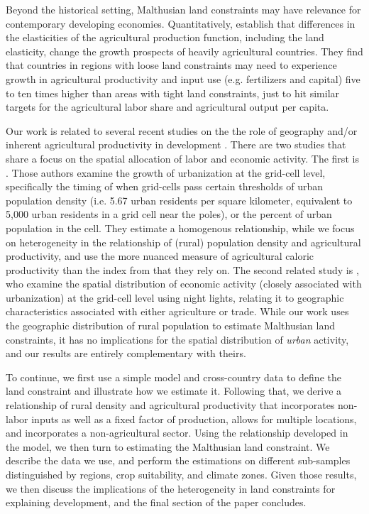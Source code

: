 \documentclass[11pt]{article}
\begin{document}
Beyond the historical setting, Malthusian land constraints may have relevance for contemporary developing economies. Quantitatively, \citet{ev2016clim,ev2016} establish that differences in the elasticities of the agricultural production function, including the land elasticity, change the growth prospects of heavily agricultural countries. They find that countries in regions with loose land constraints may need to experience growth in agricultural productivity and input use (e.g. fertilizers and capital) five to ten times higher than areas with tight land constraints, just to hit similar targets for the agricultural labor share and agricultural output per capita.

Our work is related to several recent studies on the the role of geography and/or inherent agricultural productivity in development \citep{oh2005,ashraf2010dynamics,Nunn2011,Nunn2012,mich2012,agn2013,cook2014role,cook14,fenske2014,alsan2015,ashrafmich2015,dks2015,galorozak2016,litina2016,ads2016,FrankemaPap2017}. There are two studies that share a focus on the spatial allocation of labor and economic activity. The first is \citet{mfm2014}. Those authors examine the growth of urbanization at the grid-cell level, specifically the timing of when grid-cells pass certain thresholds of urban population density (i.e. 5.67 urban residents per square kilometer, equivalent to 5,000 urban residents in a grid cell near the poles), or the percent of urban population in the cell. They estimate a homogenous relationship, while we focus on heterogeneity in the relationship of (rural) population density and agricultural productivity, and use the more nuanced measure of agricultural caloric productivity than the index from \citet{ramankutty2002} that they rely on. The second related study is \citet{hssw2016}, who examine the spatial distribution of economic activity (closely associated with urbanization) at the grid-cell level using night lights, relating it to geographic characteristics associated with either agriculture or trade. While our work uses the geographic distribution of rural population to estimate Malthusian land constraints, it has no implications for the spatial distribution of \textit{urban} activity, and our results are entirely complementary with theirs.

To continue, we first use a simple model and cross-country data to define the land constraint and illustrate how we estimate it. Following that, we derive a relationship of rural density and agricultural productivity that incorporates non-labor inputs as well as a fixed factor of production, allows for multiple locations, and incorporates a non-agricultural sector. Using the relationship developed in the model, we then turn to estimating the Malthusian land constraint. We describe the data we use, and perform the estimations on different sub-samples distinguished by regions, crop suitability, and climate zones. Given those results, we then discuss the implications of the heterogeneity in land constraints for explaining development, and the final section of the paper concludes.
\end{document}
